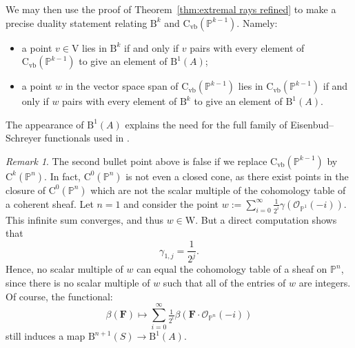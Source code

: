 \documentclass[12pt]{amsart}
\theoremstyle{definition}
\theoremstyle{remark}
\newtheorem{remark}[lemma]{Remark}
\newcommand{\PP}{\mathbb{P}}
\newcommand{\VV}{\mathrm{V}}
\newcommand{\WW}{\mathrm{W}}
\newcommand{\cO}{\mathcal{O}}
\newcommand{\FF}{\mathbf{F}}
\newcommand{\CQ}{\mathrm{C}}
\newcommand{\CvbQ}{\mathrm{C}_{\text{vb}}}
\newcommand{\BBQ}{\mathrm{B}}
\begin{document}
We may then use the proof of Theorem~\ref{thm:extremal rays refined} to make a precise duality statement relating $\BBQ^{k}$ and $\CvbQ(\PP^{k-1})$.  Namely:
\begin{itemize}
	\item a point $v\in \VV$ lies in $\BBQ^{k}$ if and only if $v$ pairs with every element of $\CvbQ(\PP^{k-1})$ to give an element of $\BBQ^1(A)$;
	\item a point $w$ in the vector space span of $\CvbQ(\PP^{k-1})$ lies in $\CvbQ(\PP^{k-1})$ if and only if $w$ pairs with every element of $\BBQ^{k}$ to give an element of $\BBQ^1(A)$.
\end{itemize}
The appearance of $\BBQ^1(A)$ explains the need for the full family of Eisenbud--Schreyer functionals used in \cite{eis-schrey1}. 

\begin{remark}\label{rmk:issues}
The second bullet point above is false if we replace $\CvbQ(\PP^{k-1})$ by $\CQ^k(\PP^n)$.  In fact, $\CQ^0(\PP^n)$ is not even a closed cone, as there exist points in the closure of $\CQ^0(\PP^n)$ which are not the scalar multiple of the cohomology table of a coherent sheaf.   Let $n=1$ and consider the point $w:=\sum_{i=0}^\infty \frac{1}{2^i} \gamma(\cO_{\PP^1}(-i))$.  
This infinite sum converges, and thus $w\in \WW$.  But a direct computation shows that
\[
\gamma_{1,j}=\frac{1}{2^{j}}.
\]
Hence, no scalar multiple of $w$ can equal the cohomology table of a sheaf on $\PP^n$, since there is no scalar multiple of $w$ such that all of the entries of $w$ are integers.  Of course, the functional:
\[
\beta(\FF)\mapsto \sum_{i=0}^\infty \tfrac{1}{2^i} \beta(\FF\cdot \cO_{\PP^n}(-i))
\]
still induces a map $\BBQ^{n+1}(S)\to \BBQ^1(A)$.
%
\end{remark}
\end{document}
